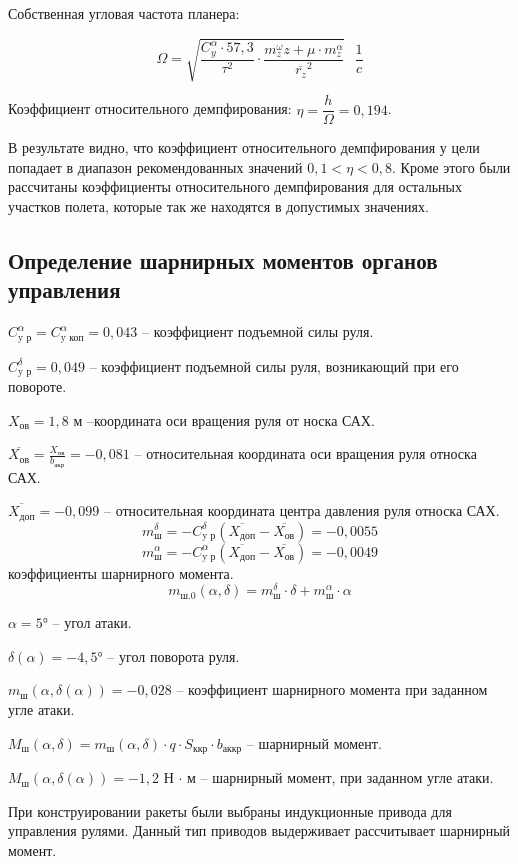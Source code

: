 Собственная угловая частота планера:

$$\Omega= \sqrt{ \frac{C_y^\alpha \cdot 57,3}{\tau^2} \cdot \frac{m_z^\omega z+\mu\cdot m_z^\alpha}{\overline{r_z}^2} } \text{ } \dfrac{1}{c}$$

Коэффициент относительного демпфирования: $\eta=\dfrac{h}{\Omega}=0,194 $.

В результате видно, что коэффициент относительного демпфирования у цели попадает в диапазон рекомендованных значений $0,1 < \eta < 0,8$. Кроме этого были рассчитаны коэффициенты относительного демпфирования для остальных участков полета, которые так же находятся в допустимых значениях.

\subsection{Определение шарнирных моментов органов управления}
$C_\text{y р}^\alpha=C_\text{y коп}^\alpha = 0,043$ – коэффициент подъемной силы руля.

$C_\text{y р}^\delta=0,049 $ – коэффициент подъемной силы руля, возникающий при его повороте.

$X_\text{ов}=1,8$ м –координата оси вращения руля от носка САХ.

$\overline{X_\text{ов}}= \frac{X_\text{ов}} {b_\text{акр}}  =-0,081$ – относительная координата оси вращения руля относка САХ.

$\overline{X_\text{доп} }=-0,099$  – относительная координата центра давления руля относка САХ.
$$m_\text{ш}^\delta=-C_\text{y р}^\delta (\overline{X_\text{доп}}-\overline{X_\text{ов}})=-0,0055 $$
$$m_\text{ш}^\alpha=-C_\text{y р}^\alpha (\overline{X_\text{доп}}-\overline{X_\text{ов}})=-0,0049 $$
коэффициенты шарнирного момента.
$$m_\text{ш.0} (\alpha,\delta)=m_\text{ш}^\delta \cdot \delta+m_\text{ш}^\alpha \cdot \alpha$$

$\alpha=5°$ – угол атаки.

$\delta(\alpha)=-4,5°$ – угол поворота руля.

$m_\text{ш} (\alpha,\delta(\alpha))=-0,028 $ – коэффициент шарнирного момента при заданном угле атаки.

$M_\text{ш} (\alpha,\delta)=m_\text{ш} (\alpha,\delta) \cdot q \cdot S_\text{ккр} \cdot b_\text{аккр} $ – шарнирный момент.

$M_\text{ш} (\alpha,\delta(\alpha))=-1,2$ Н $\cdot$ м – шарнирный момент, при заданном угле атаки.

При конструировании ракеты были выбраны индукционные привода для управления рулями. Данный тип приводов выдерживает рассчитывает шарнирный момент.


